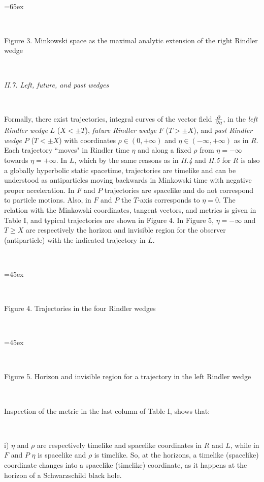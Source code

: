 \

\centerline{\epsfxsize=65ex}

\

\centerline{Figure 3. Minkowski space as the maximal analytic extension of the right Rindler wedge}

\

{\it II.7. Left, future, and past wedges}

\

Formally, there exist trajectories, integral curves of the vector field ${{\partial}\over{\partial \eta}}$, in the {\it left Rindler wedge} $L$ ($X<\pm T$), {\it future Rindler wedge} $F$ ($T>\pm X$), and {\it past Rindler wedge} $P$ ($T<\pm X$) with coordinates $\rho\in (0,+\infty)$ and $\eta\in (-\infty,+\infty)$ as in $R$. Each trajectory ``moves" in Rindler time $\eta$ and along a fixed $\rho$ from $\eta=-\infty$ towards $\eta=+\infty$. In $L$, which by the same reasons as in {\it II.4} and {\it II.5} for $R$ is also a globally hyperbolic static spacetime, trajectories are timelike and can be understood as antiparticles moving backwards in Minkowski time with negative proper acceleration. In $F$ and $P$ trajectories are spacelike and do not correspond to particle motions. Also, in $F$ and $P$ the $T$-axis corresponds to $\eta=0$. The relation with the Minkowski coordinates, tangent vectors, and metrics is given in Table I, and typical trajectories are shown in Figure 4. In Figure 5, $\eta=-\infty$ and $T\geq X$ are respectively the horizon and invisible region for the observer (antiparticle) with the indicated trajectory in $L$. 

\

\centerline{\epsfxsize=45ex} 

\

\centerline{Figure 4. Trajectories in the four Rindler wedges}  

\

\centerline{\epsfxsize=45ex} 

\

\centerline{Figure 5. Horizon and invisible region for a trajectory in the left Rindler wedge}

\

Inspection of the metric in the last column of Table I, shows that:

\

i) $\eta$ and $\rho$ are respectively timelike and spacelike coordinates in $R$ and $L$, while in $F$ and $P$ $\eta$ is spacelike and $\rho$ is timelike. So, at the horizons, a timelike (spacelike) coordinate changes into a spacelike (timelike) coordinate, as it happens at the horizon of a Schwarzschild black hole. 

